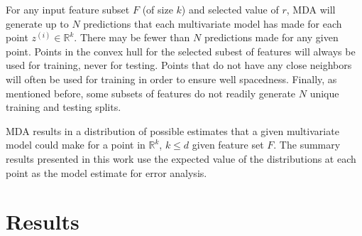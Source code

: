 \documentclass{scspaperproc}
\theoremstyle{scsthe}
\begin{document}
For any input feature subset $F$ (of size $k$) and selected value of
$r$, MDA will generate up to $N$ predictions that each multivariate
model has made for each point $z^{(i)} \in \mathbb{R}^k$. There may be
fewer than $N$ predictions made for any given point. Points in the
convex hull for the selected subest of features will always be used
for training, never for testing. Points that do not have any close
neighbors will often be used for training in order to ensure well
spacedness. Finally, as mentioned before, some subsets of features do
not readily generate $N$ unique training and testing splits.

MDA results in a distribution of possible estimates that a given
multivariate model could make for a point in $\mathbb{R}^k$, $k \leq
d$ given feature set $F$. The summary results presented in this work
use the expected value of the distributions at each point as the model
estimate for error analysis.




\section{Results}
\label{sec:results}
\end{document}

